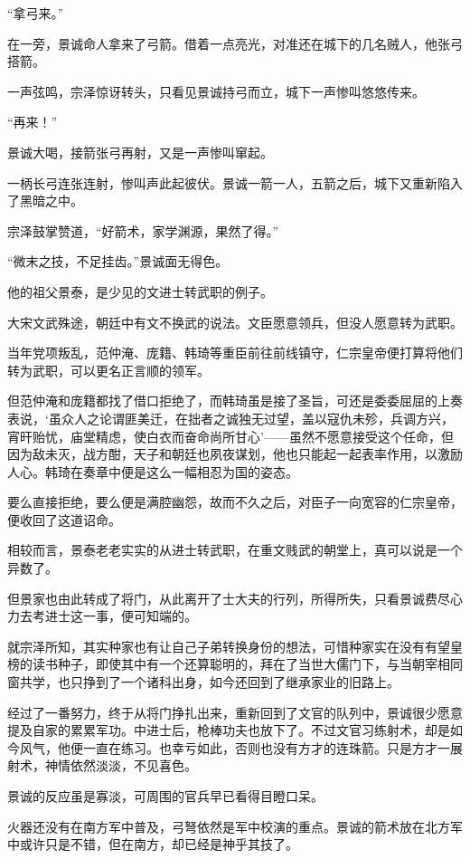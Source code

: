 “拿弓来。”

在一旁，景诚命人拿来了弓箭。借着一点亮光，对准还在城下的几名贼人，他张弓搭箭。

一声弦鸣，宗泽惊讶转头，只看见景诚持弓而立，城下一声惨叫悠悠传来。

“再来！”

景诚大喝，接箭张弓再射，又是一声惨叫窜起。

一柄长弓连张连射，惨叫声此起彼伏。景诚一箭一人，五箭之后，城下又重新陷入了黑暗之中。

宗泽鼓掌赞道，“好箭术，家学渊源，果然了得。”

“微末之技，不足挂齿。”景诚面无得色。

他的祖父景泰，是少见的文进士转武职的例子。

大宋文武殊途，朝廷中有文不换武的说法。文臣愿意领兵，但没人愿意转为武职。

当年党项叛乱，范仲淹、庞籍、韩琦等重臣前往前线镇守，仁宗皇帝便打算将他们转为武职，可以更名正言顺的领军。

但范仲淹和庞籍都找了借口拒绝了，而韩琦虽是接了圣旨，可还是委委屈屈的上奏表说，‘虽众人之论谓匪美迁，在拙者之诚独无过望，盖以寇仇未殄，兵调方兴，宵旰贻忧，庙堂精虑，使白衣而奋命尚所甘心’——虽然不愿意接受这个任命，但因为敌未灭，战方酣，天子和朝廷也夙夜谋划，他也只能起一起表率作用，以激励人心。韩琦在奏章中便是这么一幅相忍为国的姿态。

要么直接拒绝，要么便是满腔幽怨，故而不久之后，对臣子一向宽容的仁宗皇帝，便收回了这道诏命。

相较而言，景泰老老实实的从进士转武职，在重文贱武的朝堂上，真可以说是一个异数了。

但景家也由此转成了将门，从此离开了士大夫的行列，所得所失，只看景诚费尽心力去考进士这一事，便可知端的。

就宗泽所知，其实种家也有让自己子弟转换身份的想法，可惜种家实在没有有望皇榜的读书种子，即使其中有一个还算聪明的，拜在了当世大儒门下，与当朝宰相同窗共学，也只挣到了一个诸科出身，如今还回到了继承家业的旧路上。

经过了一番努力，终于从将门挣扎出来，重新回到了文官的队列中，景诚很少愿意提及自家的累累军功。中进士后，枪棒功夫也放下了。不过文官习练射术，却是如今风气，他便一直在练习。也幸亏如此，否则也没有方才的连珠箭。只是方才一展射术，神情依然淡淡，不见喜色。

景诚的反应虽是寡淡，可周围的官兵早已看得目瞪口呆。

火器还没有在南方军中普及，弓弩依然是军中校演的重点。景诚的箭术放在北方军中或许只是不错，但在南方，却已经是神乎其技了。


